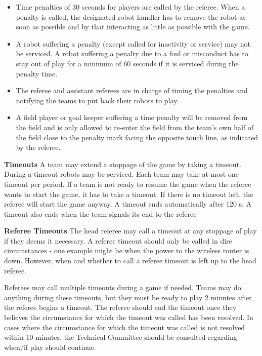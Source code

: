 \begin{itemize}
\item Time penalties of 30 seconds for players are called by the referee. When a penalty is called, the designated robot handler has to remove the robot as soon as possible and by that interacting as little as possible with the game. 
\item A robot suffering a penalty (except called for inactivity or service) may not be serviced. A robot suffering a penalty due to a foul or misconduct has to stay out of play for a minimum of 60 seconds if it is serviced during the penalty time.
\item The referee and assistant referees are in charge of timing the penalties and notifying the teams to put back their robots to play.
\item A field player or goal keeper suffering a time penalty will be removed from the field and is only allowed to re-enter the field from the team's own half of the field close to the penalty mark facing the opposite touch line, as indicated by the referee.
\end{itemize}

\bigskip

{\bfseries Timeouts}
A team may extend a stoppage of the game by taking a timeout. During a timeout
robots may be serviced. Each team may take at most one timeout per period. If a team is not ready to resume the game when the referee wants to start the game, it has to take a timeout. If there is no timeout left, the referee will start
the game anyway. A timeout ends automatically after 120 s. A timeout also ends when the team signals its end to the referee

\bigskip

{\bfseries Referee Timeouts}
The head referee may call a timeout at any stoppage of play if they deems it necessary. A referee timeout should only be called in dire circumstances - one example might be when the power to the wireless router is down. However, when and whether to call a referee timeout is left up to the head referee.

Referees may call multiple timeouts during a game if needed. Teams may do anything during these timeouts, but they must be ready to play 2 minutes after the referee begins a timeout. The referee should end the timeout once they believes the circumstance for which the timeout was called has been resolved. In cases where the circumstance for which the timeout was called is not resolved within 10 minutes, the Technical Committee should be consulted regarding when/if play should continue.

